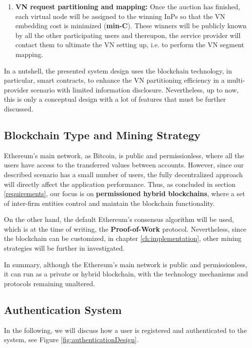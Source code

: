 \begin{enumerate}
 	\item \textbf{VN request partitioning and mapping:} Once the auction has finished, each virtual node will be assigned to the winning InPs so that the VN embedding cost is minimized (\textbf{min-C}). These winners will be publicly known by all the other participating users and thereupon, the service provider will contact them to ultimate the VN setting up, i.e. to perform the VN segment mapping.
\end{enumerate}

In a nutshell, the presented system design uses the blockchain technology, in particular, smart contracts, to enhance the VN partitioning efficiency in a multi-provider scenario with limited information disclosure. Nevertheless, up to now, this is only a conceptual design with a lot of features that must be further discussed.

\subsection{Blockchain Type and Mining Strategy}

Ethereum's main network, as Bitcoin, is public and permissionless, where all the users have access to the transferred values between accounts. However, since our described scenario has a small number of users, the fully decentralized approach will directly affect the application performance. Thus, as concluded in section \ref{requirements}, our focus is on \textbf{permissioned hybrid blockchains}, where a set of inter-firm entities control and maintain the blockchain functionality. 

On the other hand, the default Ethereum's consensus algorithm will be used, which is at the time of writing, the \textbf{Proof-of-Work} protocol. Nevertheless, since the blockchain can be customized, in chapter \ref{ch:implementation}, other mining strategies will be further in investigated.

In summary, although the Ethereum's main network is public and permissionless, it can run as a private or hybrid blockchain, with the technology mechanisms and protocols remaining unaltered.

\subsection{Authentication System} \label{authenticationSystem}

In the following, we will discuss how a user is registered and authenticated to the system, see Figure \ref{fig:authenticationDesign}.

